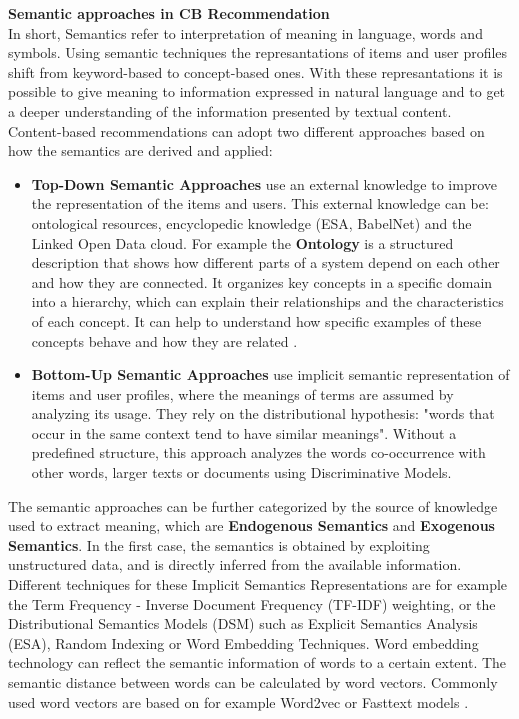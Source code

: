 \documentclass[\myFontSize,a4paper,oneside,hidelinks]{article}
\begin{document}
%
%
%
%
\textbf{Semantic approaches in CB Recommendation}\\
In short, Semantics refer to interpretation of meaning in language, words and symbols. Using semantic techniques the represantations of items and user profiles shift from keyword-based to concept-based ones.  With these represantations it is possible to give meaning to information expressed in natural language and to get a deeper understanding of the information presented by textual content.\\
Content-based recommendations can adopt two different approaches based on how the semantics are derived and applied:
\begin{itemize}
\item \textbf{Top-Down Semantic Approaches} use an external knowledge to improve the representation of the items and users. This external knowledge can be: ontological resources, encyclopedic knowledge (ESA, BabelNet) and the Linked Open Data cloud. For example the \textbf{Ontology} is a structured description that shows how different parts of a system depend on each other and how they are connected. It organizes key concepts in a specific domain into a hierarchy, which can explain their relationships and the characteristics of each concept. It can help to understand how specific examples of these concepts behave and how they are related \cite{pub.1090632691}.
%
\item \textbf{Bottom-Up Semantic Approaches} use implicit semantic representation of items and user profiles, where the meanings of terms are assumed by analyzing its usage. They rely on the distributional hypothesis: "words that occur in the same context tend to have similar meanings". Without a predefined structure, this approach analyzes the words co-occurrence with other words, larger texts or documents using Discriminative Models.\cite{DeGemmis2015119}
\end{itemize}
%
%
The semantic approaches can be further categorized by the source of knowledge used to extract meaning, which are \textbf{Endogenous Semantics} and \textbf{Exogenous Semantics}.
In the first case, the semantics is obtained by exploiting unstructured data, and is directly inferred from the available information. Different techniques for these Implicit Semantics Representations are for example the Term Frequency - Inverse Document Frequency (TF-IDF) weighting, or the Distributional Semantics Models (DSM) such as Explicit Semantics Analysis (ESA), Random Indexing or Word Embedding Techniques.
Word embedding technology can reflect the semantic information of words to a certain extent. The semantic distance between words can be calculated by word vectors. Commonly used word vectors are based on for example Word2vec or Fasttext models \cite{Huang2023}.\\
\end{document}
